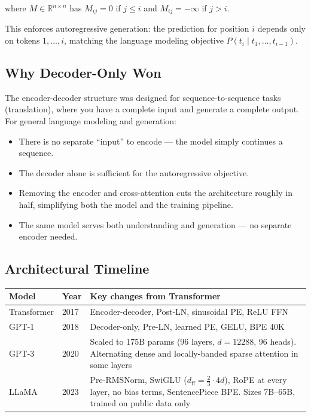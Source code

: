 \documentclass[11pt,a4paper]{article}
\newcommand{\R}{\mathbb{R}}
\newcommand{\dff}{d_{\text{ff}}}
\begin{document}
where $M \in \R^{n \times n}$ has $M_{ij} = 0$ if $j \leq i$ and $M_{ij} = -\infty$
if $j > i$.

This enforces autoregressive generation: the prediction for position $i$ depends only on
tokens $1, \ldots, i$, matching the language modeling objective
$P(t_i \mid t_1, \ldots, t_{i-1})$.

\subsection{Why Decoder-Only Won}

The encoder-decoder structure was designed for sequence-to-sequence tasks (translation),
where you have a complete input and generate a complete output. For general language
modeling and generation:

\begin{itemize}[nosep]
  \item There is no separate ``input'' to encode --- the model simply continues a sequence.
  \item The decoder alone is sufficient for the autoregressive objective.
  \item Removing the encoder and cross-attention cuts the architecture roughly in half,
    simplifying both the model and the training pipeline.
  \item The same model serves both understanding and generation --- no separate encoder
    needed.
\end{itemize}

\subsection{Architectural Timeline}

\begin{center}
\begin{tabular}{llp{7.5cm}}
\toprule
\textbf{Model} & \textbf{Year} & \textbf{Key changes from Transformer} \\
\midrule
Transformer \cite{vaswani2017} & 2017 &
  Encoder-decoder, Post-LN, sinusoidal PE, ReLU FFN \\
GPT-1 \cite{radford2018} & 2018 &
  Decoder-only, Pre-LN\footnotemark, learned PE, GELU, BPE 40K \\
GPT-3 \cite{brown2020} & 2020 &
  Scaled to 175B params (96 layers, $d{=}12288$, 96 heads). Alternating dense and
  locally-banded sparse attention in some layers \\
LLaMA \cite{touvron2023} & 2023 &
  Pre-RMSNorm, SwiGLU ($\dff = \frac{2}{3} \cdot 4d$), RoPE at every layer, no bias
  terms, SentencePiece BPE. Sizes 7B--65B, trained on public data only \\
\bottomrule
\end{tabular}
\end{center}
\end{document}
